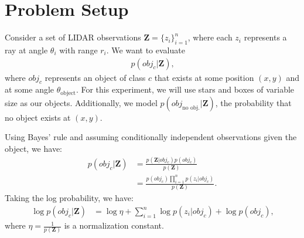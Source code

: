 \section{Problem Setup}

Consider a set of LIDAR observations $\mathbf{Z} = \{ z_i \}_{i=1}^n$, where
each $z_i$ represents a ray at angle $\theta_i$ with range $r_i$. We
want to evaluate
%
\begin{align}
  p( obj_c | \mathbf{Z} )
  \text{,}
\end{align}
%
where $obj_c$ represents an object of class $c$ that exists at some position $(x,
y)$ and at some angle $\theta_{\text{object}}$. For this experiment, we will use
stars and boxes of variable size as our objects. Additionally, we model $p(
obj_{\text{no obj.}} | \mathbf{Z})$, the probability that no object exists at $(x,
y)$.

Using Bayes' rule and assuming conditionally independent observations given the
object, we have:
%
\begin{align}
  p( obj_c | \mathbf{Z} ) &= \frac{p(\mathbf{Z} | obj_c)
    p(obj_c)}{p(\mathbf{Z})} \label{eq:p_obj_z} \\
    &= \frac
      {p(obj_c) \prod_{i=1}^{n} { p( z_i | obj_c) }}
      {p(\mathbf{Z})
      } \label{eq:cond_ind}
  \text{.}
\end{align}
%
Taking the log probability, we have:
%
\begin{align}
  \log p( obj_c | \mathbf{Z} ) &= \log{\eta} + \sum_{i=1}^{n} { \log p( z_i |
    obj_c) } + \log p ( obj_c )
  \text{,}
  \label{eq:obj_model}
\end{align}
%
where $\eta = \frac{1}{p(\mathbf{Z})}$ is a normalization constant.
